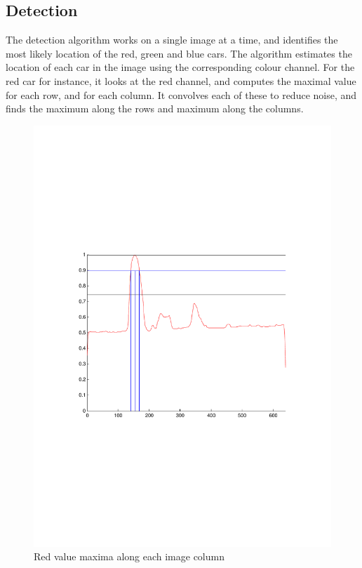 \documentclass{article}
\begin{document}
\subsection{Detection}
\label{sec:detection}

The detection algorithm works on a single image at a time, and identifies the most likely location of the red, green and blue cars. The algorithm estimates the location of each car in the image using the corresponding colour channel. For the red car for instance, it looks at the red channel, and computes the maximal value for each row, and for each column. It convolves each of these to reduce noise, and finds the maximum along the rows and maximum along the columns.



\begin{figure}[htbp!]
  \centering
    \includegraphics[width=1.0\textwidth]{../Drawings/yMaxima.pdf}
    \caption{Red value maxima along each image column}
    \label{fig:maxima}
\end{figure}
\end{document}
